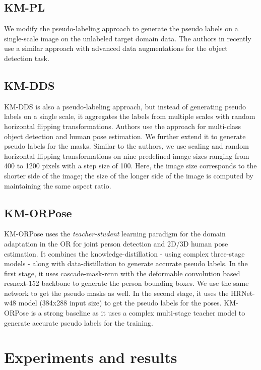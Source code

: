 \subsection{KM-PL} We modify the pseudo-labeling \citep{lee2013pseudo} approach to generate the pseudo labels on a single-scale image on the unlabeled target domain data. The authors in \citep{sohn2020simple} recently use a similar approach with advanced data augmentations for the object detection task.

\subsection{KM-DDS} KM-DDS \citep{radosavovic2018data} is also a pseudo-labeling approach, but instead of generating pseudo labels on a single scale, it aggregates the labels from multiple scales with random horizontal flipping transformations. Authors use the approach for multi-class object detection and human pose estimation. We further extend it to generate pseudo labels for the masks. Similar to the authors, we use scaling and random horizontal flipping transformations on nine predefined image sizes ranging from 400 to 1200 pixels with a step size of 100. Here, the image size corresponds to the shorter side of the image; the size of the longer side of the image is computed by maintaining the same aspect ratio.
\subsection{KM-ORPose} KM-ORPose \citep{srivastav2020human} uses the \emph{teacher-student} learning paradigm for the domain adaptation in the OR for joint person detection and 2D/3D human pose estimation. It combines the knowledge-distillation \citep{hinton2015distilling, zhang2019fast} - using complex three-stage models - along with data-distillation \citep{radosavovic2018data} to generate accurate pseudo labels. In the first stage, it uses cascade-mask-rcnn \citep{cai2019cascade} with the deformable convolution \citep{dai2017deformable} based resnext-152 backbone \citep{xie2017aggregated} to generate the person bounding boxes. We use the same network to get the pseudo masks as well. In the second stage, it uses the HRNet-w48 model (384x288 input size) \citep{SunXLW19} to get the pseudo labels for the poses. KM-ORPose is a strong baseline as it uses a complex multi-stage teacher model to generate accurate pseudo labels for the training.


\section{Experiments and results}
